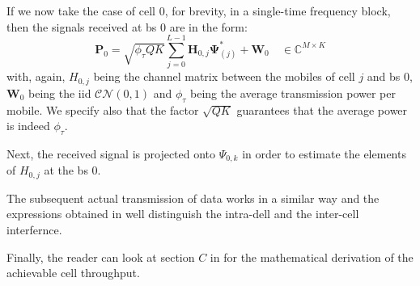 \documentclass[11pt]{book}
\begin{document}
If we now take the case of cell $0$, for brevity, in a single-time frequency block, then the signals received at \gls{bs} $0$ are in the form:
\begin{equation}
  \mathbf{P}_0 = \sqrt{\phi_{\tau} QK}\sum_{j=0}^{L-1}\mathbf{H}_{0,j}\mathbf{\Psi}_{(j)}^* + \mathbf{W}_0 \quad \in \mathbb{C}^{M\times K}
\end{equation}
with, again, $H_{0,j}$ being the channel matrix between the mobiles of cell $j$ and \gls{bs} $0$, $\mathbf{W}_0$ being the iid $\mathcal{CN}(0,1)$ and $\phi_{\tau}$ being the average transmission power per mobile. We specify also that the factor $\sqrt{QK}$ guarantees that the average power is indeed $\phi_{\tau}$.

Next, the received signal is projected onto $\Psi_{0,k}$ in order to estimate the elements of $H_{0,j}$ at the \gls{bs} $0$.

The subsequent actual transmission of data works in a similar way and the expressions obtained in \cite{Ahsan2016} well distinguish the intra-dell and the inter-cell interfernce.

Finally, the reader can look at section $C$ in \cite{Ahsan2016} for the mathematical derivation of the achievable cell throughput.
\end{document}
